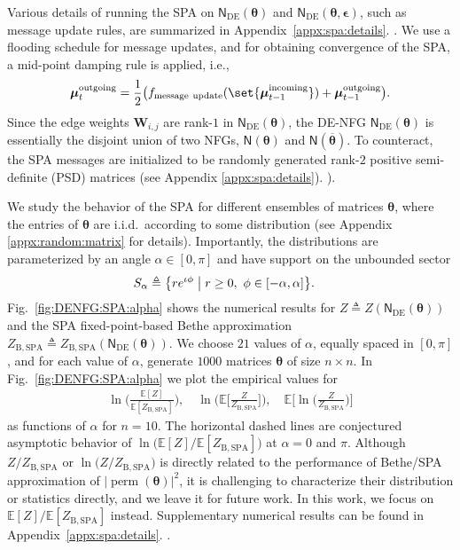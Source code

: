 \documentclass[conference]{IEEEtran}
\theoremstyle{plain}
\theoremstyle{definition}
\newcommand{\B}{\mathrm{B}}
\newcommand{\SPA}{\mathrm{SPA}}
\newcommand{\E}{\mathbb {E}}
\newcommand{\sfn}{\mathsf{N}}
\newcommand{\perm}{\operatorname{perm}}
\newcommand{\btheta}{\boldsymbol{\theta}}
\newcommand{\defeq}{\triangleq}
\newcommand{\sfnDE}{\sfn_{\mathrm{DE}}}
\begin{document}
Various details of running the SPA on $\sfnDE(\btheta)$ and
$\sfnDE(\btheta,\boldsymbol\epsilon)$, such as message update rules, are
summarized in \iflongversion Appendix~\ref{appx:spa:details}. \else
\cite{zhou2026}. \fi We use a flooding schedule for message updates, and for
obtaining convergence of the SPA, a mid-point damping rule is applied, i.e.,
\[
 \boldsymbol{\mu}^\mathrm{outgoing}_{t}=\frac{1}{2}\bigl(f_{\mathrm{message\
    update}}(\set{\boldsymbol{\mu}^\mathrm{incoming}_{t-1}})+\boldsymbol{\mu}^\mathrm{outgoing}_{t-1}\bigr)
 .\] Since the edge weights $\mathbf W_{i,j}$ are rank-$1$ in $\sfnDE(\btheta)$,
   the DE-NFG $\sfnDE(\btheta)$ is essentially the disjoint union of two NFGs,
   $\sfn(\btheta)$ and $\sfn(\overline{\btheta})$. To counteract, the SPA
   messages are initialized to be randomly generated rank-$2$ positive
   semi-definite (PSD) matrices (see \iflongversion Appendix
   \ref{appx:spa:details}). \else \cite{zhou2026}). \fi


We study the behavior of the SPA for different ensembles of matrices $\btheta$,
where the entries of $\btheta$ are i.i.d.\ according to some distribution (see
\iflongversion Appendix \ref{appx:random:matrix} \else \cite{zhou2026} \fi for
details). Importantly, the distributions are parameterized by an angle $\alpha
\in [0,\pi]$ and have support on the unbounded sector
\begin{align*}
 S_\alpha
  & \defeq
 \bigl\{
 r e^{\iota \phi}
 \bigm|
 r \ge 0,\ \phi \in [-\alpha,\alpha]
 \bigr\}.
\end{align*}
Fig.~\ref{fig:DENFG:SPA:alpha} shows the numerical results for
$Z \defeq Z(\sfnDE(\btheta))$ and the SPA fixed-point-based Bethe
approximation $Z_{\B,\SPA} \defeq Z_{\B,\SPA}(\sfnDE(\btheta))$. We choose
$21$ values of $\alpha$, equally spaced in $[0,\pi]$, and for each value of
$\alpha$, generate $1000$ matrices $\btheta$ of size $n\times n$.  In
Fig.~\ref{fig:DENFG:SPA:alpha} we plot the empirical values for
\begin{align*}
 \ln
 \biggl( \frac{\E[Z]}{\E[Z_{\B,\SPA}]} \biggr),
 \quad
 \ln
 \biggl(
 \E\biggl[\frac{Z}{Z_{\B,\SPA}}\biggr]
 \biggr),
 \quad
 \E\biggl[\ln\biggl( \frac{Z}{Z_{\B,\SPA}} \biggr) \biggr]
\end{align*}
as functions of $\alpha$ for $n=10$. The horizontal dashed lines are
conjectured asymptotic behavior of
$\ln\bigl( \E[Z] / \E[Z_{\B,\SPA}] \bigr)$ at $\alpha = 0$ and
$\pi$. Although $Z / Z_{\B,\SPA}$ or
$\ln\bigl( Z / Z_{\B,\SPA}\bigr)$ is directly related to the performance of Bethe/SPA
approximation of $|\perm(\btheta)|^2$, it is challenging to characterize their distribution
or statistics directly, and we leave it for future work. In this work, we focus on
$\E[Z] / \E[Z_{\B,\SPA}]$ instead.
Supplementary numerical results can be found in
\iflongversion Appendix~\ref{appx:spa:details}. \else \cite{zhou2026}.\fi
\end{document}
